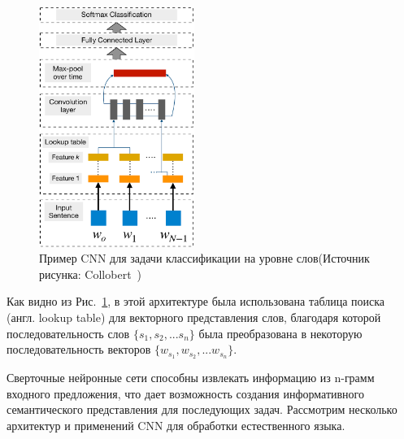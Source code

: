 \begin{figure}[t]

\centering
\includegraphics[width=0.45\textwidth]{img/collobertCNN.pdf}
\caption{\label{fig:collobertCNN}Пример CNN для задачи классификации на уровне слов\hspace{\textwidth}(Источник рисунка: Collobert~\autocite{10.1145/1390156.1390177})}
\end{figure}

Как видно из Рис.~\ref{fig:collobertCNN}, в этой архитектуре была использована таблица поиска (англ. lookup table) для векторного представления слов, благодаря которой последовательность слов $\{s_1, s_2, ... s_n\}$ была преобразована в некоторую последовательность векторов $\{ {{w}_{s_1}}, {{w}_{s_2}}, ... {{w}_{s_n}} \}$.

Сверточные нейронные сети способны извлекать информацию из n-грамм входного предложения, что дает возможность создания информативного семантического представления для последующих задач. Рассмотрим несколько архитектур и применений CNN для обработки естественного языка.

